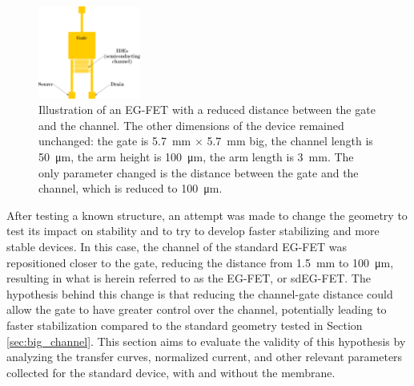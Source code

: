 \begin{figure}[hb]
    \centering
    \includegraphics[width = 0.3\textwidth]{figures/chapter3/sdEGFET/sdEGFET_scheme.pdf}
    \caption{Illustration of an EG-FET with a reduced distance between the gate and the channel. The other dimensions of the device remained unchanged: the gate is \SI{5.7}{\mm} $\times$ \SI{5.7}{\mm} big, the channel length is \SI{50}{\um}, the arm height is \SI{100}{\um}, the arm length is \SI{3}{\mm}. The only parameter changed is the distance between the gate and the channel, which is reduced to \SI{100}{\um}.}
\end{figure}

After testing a known structure, an attempt was made to change the geometry to test its impact on stability and to try to develop faster stabilizing and more stable devices. In this case, the channel of the standard EG-FET was repositioned closer to the gate, reducing the distance from \SI{1.5}{\mm} to \SI{100}{\um}, resulting in what is herein referred to as the  EG-FET, or sdEG-FET. The hypothesis behind this change is that reducing the channel-gate distance could allow the gate to have greater control over the channel, potentially leading to faster stabilization compared to the standard geometry tested in Section \ref{sec:big_channel}. This section aims to evaluate the validity of this hypothesis by analyzing the transfer curves, normalized current, and other relevant parameters collected for the standard device, with and without the membrane.

